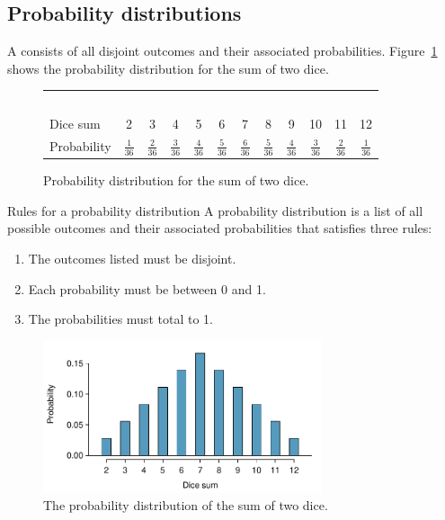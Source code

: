 \textD{\newpage}


\subsection{Probability distributions}
\label{introProbDistributions}

A  consists of all disjoint outcomes and their associated probabilities. Figure~\ref{diceProb} shows the probability distribution for the sum of two dice. 

\begin{figure}[h] \small
\centering
\begin{tabular}{l ccc ccc ccc cc}
  \hline
  \ \vspace{-3mm} \\
Dice sum\vspace{0.3mm} & 2 & 3 & 4 & 5 & 6 & 7 & 8 & 9 & 10 & 11 & 12  \\
Probability & $\frac{1}{36}$ & $\frac{2}{36}$ & $\frac{3}{36}$ & $\frac{4}{36}$ & $\frac{5}{36}$ & $\frac{6}{36}$ & $\frac{5}{36}$ & $\frac{4}{36}$ & $\frac{3}{36}$ & $\frac{2}{36}$ & $\frac{1}{36}$\vspace{1mm} \\
   \hline
\end{tabular}
\caption{Probability distribution for the sum of two dice.}
\label{diceProb}
\end{figure}

\begin{onebox}{Rules for a probability distribution}
A probability distribution is a list of all possible outcomes and their associated probabilities that satisfies three rules: \vspace{-2mm}
\begin{enumerate}
\setlength{\itemsep}{0mm}
\item The outcomes listed must be disjoint.
\item Each probability must be between 0 and 1.
\item The probabilities must total to 1. \vspace{1mm}
\end{enumerate}
\end{onebox}

\begin{figure}[h]
\centering
\includegraphics[width=0.73\textwidth]{ch_probability_oi_biostat/figures/diceSumDist/diceSumDist}
\caption{The probability distribution of the sum of two dice.}
\label{diceSumDist}
\end{figure}

